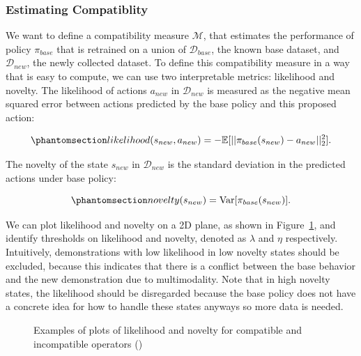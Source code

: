 \documentclass[
  letterpaper,
  numbers=noenddot,
  DIV=11]{scrreprt}
\theoremstyle{plain}
\theoremstyle{definition}
\theoremstyle{remark}
\begin{document}
\subsubsection{Estimating Compatiblity}\label{estimating-compatiblity}

We want to define a compatibility measure \(\mathcal{M}\), that
estimates the performance of policy \(\pi_{base}\) that is retrained on
a union of \(\mathcal{D}_{base}\), the known base dataset, and
\(\mathcal{D}_{new}\), the newly collected dataset. To define this
compatibility measure in a way that is easy to compute, we can use two
interpretable metrics: likelihood and novelty. The likelihood of actions
\(a_{new}\) in \(\mathcal{D}_{new}\) is measured as the negative mean
squared error between actions predicted by the base policy and this
proposed action:

\begin{equation}\phantomsection\label{eq-eq3.61}{likelihood(s_{new}, a_{new}) = -\mathbb{E}[|| \pi_{base}(s_{new}) - a_{new} ||^2_2].}\end{equation}

The novelty of the state \(s_{new}\) in \(\mathcal{D}_{new}\) is the
standard deviation in the predicted actions under base policy:

\begin{equation}\phantomsection\label{eq-eq3.62}{novelty(s_{new}) = \mathrm{Var}[\pi_{base}(s_{new})].}\end{equation}

We can plot likelihood and novelty on a 2D plane, as shown in
Figure~\ref{fig-likelihood_novelty}, and identify thresholds on
likelihood and novelty, denoted as \(\lambda\) and \(\eta\)
respectively. Intuitively, demonstrations with low likelihood in low
novelty states should be excluded, because this indicates that there is
a conflict between the base behavior and the new demonstration due to
multimodality. Note that in high novelty states, the likelihood should
be disregarded because the base policy does not have a concrete idea for
how to handle these states anyways so more data is needed.

\begin{figure}


\caption{\label{fig-likelihood_novelty}Examples of plots of likelihood
and novelty for compatible and incompatible operators
()}

\end{figure}%
\end{document}
